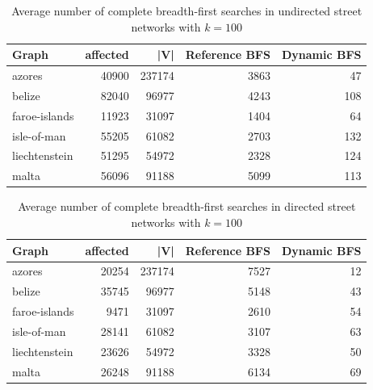 \begin{table}[h!]
\centering
\begin{tabular}{lrrrr}
\hline
 Graph         &   affected &    |V| &   Reference BFS &   Dynamic BFS \\
\hline
 azores        &      40900 & 237174 &            3863 &            47 \\
 belize        &      82040 &  96977 &            4243 &           108 \\
 faroe-islands &      11923 &  31097 &            1404 &            64 \\
 isle-of-man   &      55205 &  61082 &            2703 &           132 \\
 liechtenstein &      51295 &  54972 &            2328 &           124 \\
 malta         &      56096 &  91188 &            5099 &           113 \\
\hline
\end{tabular}
\caption{Average number of complete breadth-first searches in undirected street networks with $k = 100$}
\label{tbl:bfsCountUndirected}
\end{table}

\begin{table}[h!]
\centering
\begin{tabular}{lrrrr}
\hline
 Graph         &   affected &    |V| &   Reference BFS &   Dynamic BFS \\
\hline
 azores        &      20254 & 237174 &            7527 &            12 \\
 belize        &      35745 &  96977 &            5148 &            43 \\
 faroe-islands &       9471 &  31097 &            2610 &            54 \\
 isle-of-man   &      28141 &  61082 &            3107 &            63 \\
 liechtenstein &      23626 &  54972 &            3328 &            50 \\
 malta         &      26248 &  91188 &            6134 &            69 \\
\hline
\end{tabular}
\caption{Average number of complete breadth-first searches in directed street networks with $k = 100$}
\label{tbl:bfsCountDirected}
\end{table}



